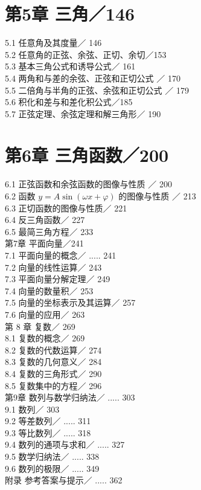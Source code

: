 \documentclass[10pt]{article}
\begin{document}
\section*{第5章 三角／146}
5.1 任意角及其度量／ 146\\
5.2 任意角的正弦、余弦、正切、余切／153\\
5.3 基本三角公式和诱导公式／ 161\\
5.4 两角和与差的余弦、正弦和正切公式 ／ 170\\
5.5 二倍角与半角的正弦、余弦和正切公式 ／ 179\\
5.6 积化和差与和差化积公式／185\\
5.7 正弦定理、余弦定理和解三角形／ 190

\section*{第6章 三角函数／200}
6.1 正弦函数和余弦函数的图像与性质 ／ 200\\
6.2 函数 \(y=A \sin (\omega x+\varphi)\) 的图像与性质 ／ 213\\
6.3 正切函数的图像与性质／ 221\\
6.4 反三角函数／ 227\\
6.5 最简三角方程／ 233\\
第7章 平面向量／241\\
7.1 平面向量的概念／ ..... 241\\
7.2 向量的线性运算／ 243\\
7.3 平面向量分解定理／ 249\\
7.4 向量的数量积／ 253\\
7.5 向量的坐标表示及其运算／ 257\\
7.6 向量的应用／ 263\\
第 8 章 复数／ 269\\
8.1 复数的概念／ 269\\
8.2 复数的代数运算／ 274\\
8.3 复数的几何意义／ 284\\
8.4 复数的三角形式／ 290\\
8.5 复数集中的方程／ 296\\
第9章 数列与数学归纳法／ ..... 303\\
9.1 数列／ 303\\
9.2 等差数列／ ..... 311\\
9.3 等比数列／ ..... 318\\
9.4 数列的通项与求和／ ..... 327\\
9.5 数学归纳法／ ..... 338\\
9.6 数列的极限／ ..... 349\\
附录 参考答案与提示／ ..... 362
\end{document}
